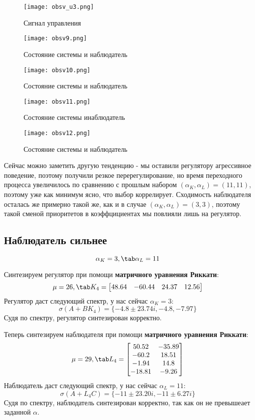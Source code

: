 \newpage
\begin{figure}[ht]
  \centering
  \texttt{[image: obsv\_u3.png]}
  \caption{Сигнал управления}
\end{figure}
\begin{figure}[ht]
  \centering
  \texttt{[image: obsv9.png]}
  \caption{Состояние системы и наблюдатель}
\end{figure}
\newpage
\begin{figure}[ht]
  \centering
  \texttt{[image: obsv10.png]}
  \caption{Состояние системы и наблюдатель}
\end{figure}
\begin{figure}[ht]
  \centering
  \texttt{[image: obsv11.png]}
  \caption{Состояние системы инаблюдатель}
\end{figure}
\begin{figure}[ht]
  \centering
  \texttt{[image: obsv12.png]}
  \caption{Состояние системы и наблюдатель}
\end{figure}

Сейчас можно заметить другую тенденцию - мы оставили регулятору агрессивное поведение, поэтому получили резкое перерегулирование, но время переходного процесса увеличилось по сравнению с прошлым набором $(\alpha_K, \alpha_L)=(11, 11)$, поэтому уже как минимум ясно, что выбор коррелирует. 
Сходимость наблюдателя осталась же примерно такой же, как и в случае $(\alpha_K, \alpha_L)=(3, 3)$, поэтому такой сменой приоритетов в коэффцициентах мы повлияли лишь на регулятор.

\newpage
\subsection{Наблюдатель сильнее}
$$
  \alpha_K = 3, \tab \alpha_L = 11
$$

Синтезируем регулятор при помощи \textbf{матричного уравнения Риккати}:
$$
\mu = 26, \tab K_4 = \begin{bmatrix}
  48.64 & -60.44 & 24.37 & 12.56 \\
\end{bmatrix}
$$
Регулятор даст следующий спектр, у нас сейчас $\alpha_K = 3$:
$$
  \sigma(A+BK_4) =\{ -4.8 \pm 23.74i, -4.8, -7.97 \}
$$
Судя по спектру, регулятор синтезирован корректно. 

Теперь синтезируем наблюдателя при помощи \textbf{матричного уравнения Риккати}:
$$
\mu = 29, \tab L_4 = \begin{bmatrix}
  50.52 & -35.89 \\
  -60.2 & 18.51 \\
  -1.94 & 14.8 \\
  -18.81 & -9.26 \\
\end{bmatrix}
$$
 Наблюдатель даст следующий спектр, у нас сейчас $\alpha_L = 11$:
$$
  \sigma(A+L_4 C) = \{-11 \pm 23.20i, -11 \pm 6.27i  \}
$$
Судя по спектру, наблюдатель синтезирован корректно, так как он не превышеает заданной $\alpha$.

